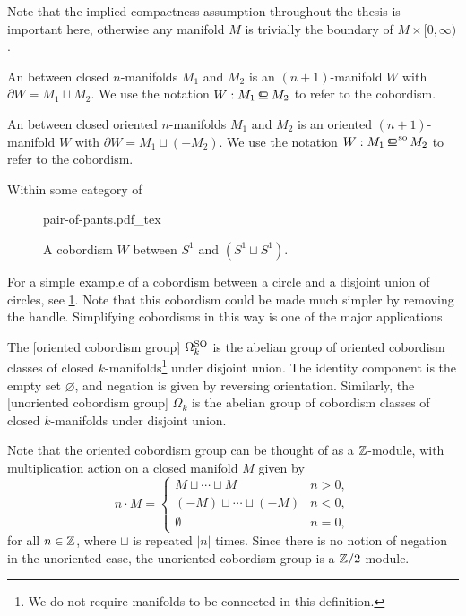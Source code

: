 \begin{remark}
	Note that the implied compactness assumption throughout the thesis is important here, otherwise any manifold $M$ is trivially the boundary of $M\times [0,\infty)$. 
\end{remark}

\begin{definition}
	An  between closed $n$-manifolds $M_1$ and $M_2$ is an $(n+1)$-manifold $W$ with $\partial W = M_1\sqcup M_2$. We use the notation $W : M_1\bord M_2$ to refer to the cobordism.
\end{definition}

\begin{definition}
	An  between closed oriented $n$-manifolds $M_1$ and $M_2$ is an oriented $(n+1)$-manifold $W$ with $\partial W = M_1\sqcup (-M_2)$. We use the notation $W : M_1\sobord M_2$ to refer to the cobordism.
\end{definition}

\begin{example}
	Within some category of 
\end{example}

\begin{figure}[ht]
	\centering
	{pair-of-pants.pdf_tex}
	\caption{A cobordism $W$ between $S^1$ and $(S^1\sqcup S^1)$.}\label{fig:pair-of-pants}
\end{figure}

For a simple example of a cobordism between a circle and a disjoint union of circles, see \cref{fig:pair-of-pants}. Note that this cobordism could be made much simpler by removing the handle. Simplifying cobordisms in this way is one of the major applications

\begin{definition}
	The [oriented cobordism group] $\Omega^{\operatorname{SO}}_k$ is the abelian group of oriented cobordism classes of closed $k$-manifolds\footnote{We do not require manifolds to be connected in this definition.}
	under disjoint union. The identity component is the empty set $\varnothing$, and negation is given by reversing orientation. Similarly, the [unoriented cobordism group] $\Omega_k$ is the abelian group of cobordism classes of closed $k$-manifolds under disjoint union.
\end{definition}

Note that the oriented cobordism group can be thought of as a $\mathbb{Z}$-module, with multiplication action on a closed manifold $M$ given by
\[
	n \cdot M = \begin{cases} M\sqcup \cdots \sqcup M & n > 0,\\ (-M)\sqcup \cdots \sqcup (-M) & n < 0,\\ \emptyset & n=0,\end{cases}
\]
for all $n\in \mathbb{Z}$, where $\sqcup$ is repeated $|n|$ times. Since there is no notion of negation in the unoriented case, the unoriented cobordism group is a $\mathbb{Z}/2$-module.

